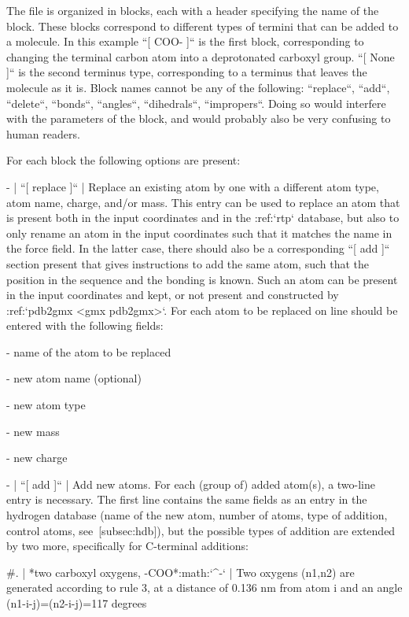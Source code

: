 The file is organized in blocks, each with a header specifying the name
of the block. These blocks correspond to different types of termini that
can be added to a molecule. In this example ``[ COO- ]`` is
the first block, corresponding to changing the terminal carbon atom into
a deprotonated carboxyl group. ``[ None ]`` is the second
terminus type, corresponding to a terminus that leaves the molecule as
it is. Block names cannot be any of the following:
``replace``, ``add``, ``delete``,
``bonds``, ``angles``,
``dihedrals``, ``impropers``. Doing so would
interfere with the parameters of the block, and would probably also be
very confusing to human readers.

For each block the following options are present:

-  | ``[ replace ]``
   | Replace an existing atom by one with a different atom type, atom
     name, charge, and/or mass. This entry can be used to replace an
     atom that is present both in the input coordinates and in the
     :ref:`rtp` database, but also to only rename an atom in
     the input coordinates such that it matches the name in the force
     field. In the latter case, there should also be a corresponding
     ``[ add ]`` section present that gives instructions to
     add the same atom, such that the position in the sequence and the
     bonding is known. Such an atom can be present in the input
     coordinates and kept, or not present and constructed by
     :ref:`pdb2gmx <gmx pdb2gmx>`. For each atom to be replaced on line
     should be entered with the following fields:

   -  name of the atom to be replaced

   -  new atom name (optional)

   -  new atom type

   -  new mass

   -  new charge

-  | ``[ add ]``
   | Add new atoms. For each (group of) added atom(s), a two-line entry
     is necessary. The first line contains the same fields as an entry
     in the hydrogen database (name of the new atom, number of atoms,
     type of addition, control atoms, see [subsec:hdb]), but the
     possible types of addition are extended by two more, specifically
     for C-terminal additions:

   #. | *two carboxyl oxygens, -COO*:math:`^-`
      | Two oxygens (n1,n2) are generated according to rule 3, at a
        distance of 0.136 nm from atom i and an angle
        (n1-i-j)=(n2-i-j)=117 degrees

